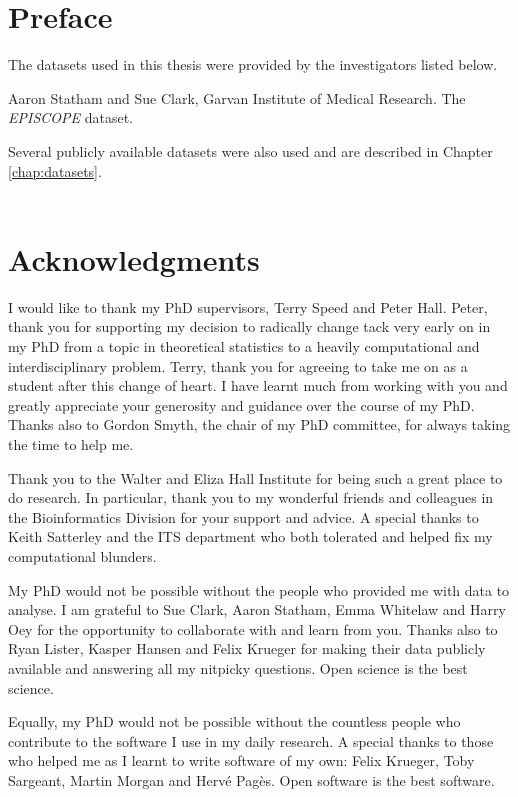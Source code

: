 \documentclass[11pt,a4paper,oneside]{book}	%
\begin{document}
\chapter{Preface}

The datasets used in this thesis were provided by the investigators listed below.

Aaron Statham and Sue Clark, Garvan Institute of Medical Research. The \emph{EPISCOPE} dataset.

Several publicly available datasets were also used and are described in Chapter \ref{chap:datasets}.\\\\

\chapter{Acknowledgments}

I would like to thank my PhD supervisors, Terry Speed and  Peter Hall. Peter, thank you for supporting my decision to radically change tack very early on in my PhD from a topic in theoretical statistics to a heavily computational and interdisciplinary problem. Terry, thank you for agreeing to take me on as a student after this change of heart. I have learnt much from working with you and greatly appreciate your generosity and guidance over the course of my PhD. Thanks also to Gordon Smyth, the chair of my PhD committee, for always taking the time to help me.

Thank you to the Walter and Eliza Hall Institute for being such a great place to do research. In particular, thank you to my wonderful friends and colleagues in the Bioinformatics Division for your support and advice. A special thanks to Keith Satterley and the ITS department who both tolerated and helped fix my computational blunders.

My PhD would not be possible without the people who provided me with data to analyse. I am grateful to Sue Clark, Aaron Statham, Emma Whitelaw and Harry Oey for the opportunity to collaborate with and learn from you. Thanks also to Ryan Lister, Kasper Hansen and Felix Krueger for making their data publicly available and answering all my nitpicky questions. Open science is the best science.

Equally, my PhD would not be possible without the countless people who contribute to the software I use in my daily research. A special thanks to those who helped me as I learnt to write software of my own: Felix Krueger, Toby Sargeant, Martin Morgan and Hervé Pagès. Open software is the best software.
\end{document}
